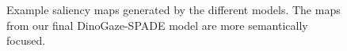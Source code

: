 \begin{figure}[h!]
\centering
\caption[Qualitative comparison of saliency maps]{Example saliency maps generated by the different models. The maps from our final DinoGaze-SPADE model are more semantically focused.}
\label{fig:qualitative_maps}
\end{figure}
